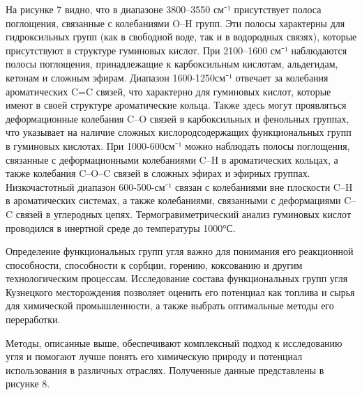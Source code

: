На рисунке 7 видно, что в диапазоне 3800--3550 см⁻¹ присутствует полоса
поглощения, связанные с колебаниями O--H групп. Эти полосы характерны
для гидроксильных групп (как в свободной воде, так и в водородных
связях), которые присутствуют в структуре гуминовых кислот. При
2100--1600 см⁻¹ наблюдаются полосы поглощения, принадлежащие к
карбоксильным кислотам, альдегидам, кетонам и сложным эфирам. Диапазон
1600-1250см⁻¹ отвечает за колебания ароматических C=C связей, что
характерно для гуминовых кислот, которые имеют в своей структуре
ароматические кольца. Также здесь могут проявляться деформационные
колебания C--O связей в карбоксильных и фенольных группах, что указывает
на наличие сложных кислородсодержащих функциональных групп в гуминовых
кислотах. При 1000-600см⁻¹ можно наблюдать полосы поглощения, связанные
с деформационными колебаниями C--H в ароматических кольцах, а также
колебания C--O--C связей в сложных эфирах и эфирных группах.
Низкочастотный диапазон 600-500-см⁻¹ связан с колебаниями вне плоскости
C--H в ароматических системах, а также колебаниями, связанными с
деформациями C--C связей в углеродных цепях. Термогравиметрический
анализ гуминовых кислот проводился в инертной среде до температуры
1000°С.

Определение функциональных групп угля важно для понимания его
реакционной способности, способности к сорбции, горению, коксованию и
другим технологическим процессам. Исследование состава функциональных
групп угля Кузнецкого месторождения позволяет оценить его потенциал как
топлива и сырья для химической промышленности, а также выбрать
оптимальные методы его переработки.

Методы, описанные выше, обеспечивают комплексный подход к исследованию
угля и помогают лучше понять его химическую природу и потенциал
использования в различных отраслях. Полученные данные представлены в
рисунке 8.

